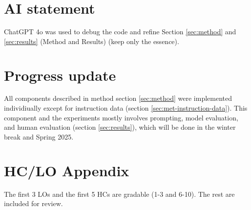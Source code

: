 \documentclass[11pt, onecolumn]{article}
\begin{document}
\clearpage

\appendix

\section{AI statement}
\label{sec:ai}

ChatGPT 4o was used to debug the code and refine Section \ref{sec:method} and \ref{sec:results} (Method and Results) (keep only the essence).

\section{Progress update}
\label{sec:progress}

All components described in method section \ref{sec:method} were implemented individiually except for instruction data (section \ref{sec:met-instruction-data}). This component and the experiments mostly involves prompting, model evaluation, and human evaluation (section \ref{sec:results}), which will be done in the winter break and Spring 2025.

\section{HC/LO Appendix}
\label{sec:hclo}

The first 3 LOs and the first 5 HCs are gradable (1-3 and 6-10). The rest are included for review.
\end{document}
